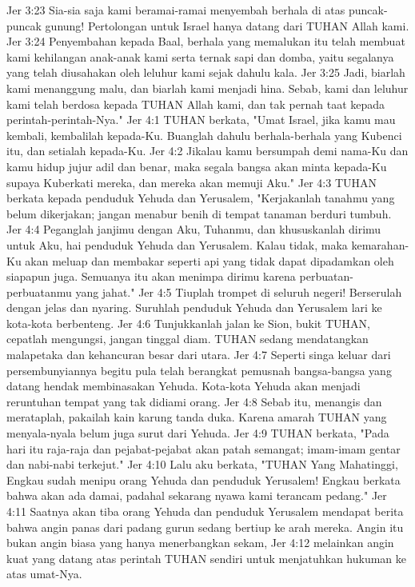 Jer 3:23  Sia-sia saja kami beramai-ramai menyembah berhala di atas puncak-puncak gunung! Pertolongan untuk Israel hanya datang dari TUHAN Allah kami.
Jer 3:24  Penyembahan kepada Baal, berhala yang memalukan itu telah membuat kami kehilangan anak-anak kami serta ternak sapi dan domba, yaitu segalanya yang telah diusahakan oleh leluhur kami sejak dahulu kala.
Jer 3:25  Jadi, biarlah kami menanggung malu, dan biarlah kami menjadi hina. Sebab, kami dan leluhur kami telah berdosa kepada TUHAN Allah kami, dan tak pernah taat kepada perintah-perintah-Nya."
Jer 4:1  TUHAN berkata, "Umat Israel, jika kamu mau kembali, kembalilah kepada-Ku. Buanglah dahulu berhala-berhala yang Kubenci itu, dan setialah kepada-Ku.
Jer 4:2  Jikalau kamu bersumpah demi nama-Ku dan kamu hidup jujur adil dan benar, maka segala bangsa akan minta kepada-Ku supaya Kuberkati mereka, dan mereka akan memuji Aku."
Jer 4:3  TUHAN berkata kepada penduduk Yehuda dan Yerusalem, "Kerjakanlah tanahmu yang belum dikerjakan; jangan menabur benih di tempat tanaman berduri tumbuh.
Jer 4:4  Peganglah janjimu dengan Aku, Tuhanmu, dan khususkanlah dirimu untuk Aku, hai penduduk Yehuda dan Yerusalem. Kalau tidak, maka kemarahan-Ku akan meluap dan membakar seperti api yang tidak dapat dipadamkan oleh siapapun juga. Semuanya itu akan menimpa dirimu karena perbuatan-perbuatanmu yang jahat."
Jer 4:5  Tiuplah trompet di seluruh negeri! Berserulah dengan jelas dan nyaring. Suruhlah penduduk Yehuda dan Yerusalem lari ke kota-kota berbenteng.
Jer 4:6  Tunjukkanlah jalan ke Sion, bukit TUHAN, cepatlah mengungsi, jangan tinggal diam. TUHAN sedang mendatangkan malapetaka dan kehancuran besar dari utara.
Jer 4:7  Seperti singa keluar dari persembunyiannya begitu pula telah berangkat pemusnah bangsa-bangsa yang datang hendak membinasakan Yehuda. Kota-kota Yehuda akan menjadi reruntuhan tempat yang tak didiami orang.
Jer 4:8  Sebab itu, menangis dan merataplah, pakailah kain karung tanda duka. Karena amarah TUHAN yang menyala-nyala belum juga surut dari Yehuda.
Jer 4:9  TUHAN berkata, "Pada hari itu raja-raja dan pejabat-pejabat akan patah semangat; imam-imam gentar dan nabi-nabi terkejut."
Jer 4:10  Lalu aku berkata, "TUHAN Yang Mahatinggi, Engkau sudah menipu orang Yehuda dan penduduk Yerusalem! Engkau berkata bahwa akan ada damai, padahal sekarang nyawa kami terancam pedang."
Jer 4:11  Saatnya akan tiba orang Yehuda dan penduduk Yerusalem mendapat berita bahwa angin panas dari padang gurun sedang bertiup ke arah mereka. Angin itu bukan angin biasa yang hanya menerbangkan sekam,
Jer 4:12  melainkan angin kuat yang datang atas perintah TUHAN sendiri untuk menjatuhkan hukuman ke atas umat-Nya.

